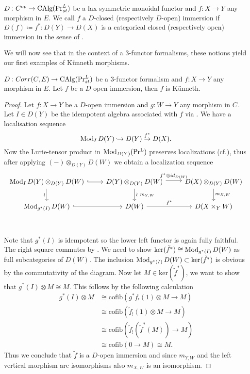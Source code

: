 \begin{definition}\label{def open immersion for D Cop}
$D: C^{op} \to \operatorname{CAlg}(\Pr_{st}^L)$ be a lax symmetric monoidal functor and $f: X \to Y$ any morphism in $E$. We call $f$ a $D$-closed  (respectively $D$-open) immersion if $D(f)\coloneqq f^* : D(Y) \to D(X)$ is a categorical closed (respectively open) immersion in the sense of .
\end{definition}
We will now see that in the context of a $3$-functor formalisms, these notions yield our first examples of Künneth morphisms.
\begin{proposition}\label{open immersion and closed immersions are Künneth}
$D: Corr(C,E) \to \operatorname{CAlg}(\Pr_{st}^L)$ be a $3$-functor formalism and $f: X \to Y$ any morphism in $E$. 
Let $f$ be a $D$-open immersion, then $f$ is Künneth.

\end{proposition}
\begin{proof}
 Let $f: X \to Y$ be a $D$-open immersion and $g: W \to Y$ any morphism in $C$. Let $I \in D(Y)$ be the idempotent algebra associated with $f$ via . We have a localisation sequence
 \[
 \operatorname{Mod}_ID(Y) \hookrightarrow D(Y) \overset{f^*}{\to} D(X).
 \]
 Now the Lurie-tensor product in $\operatorname{Mod}_{D(Y)}(\operatorname{Pr^{L}})$ preserves localizations (cf.\Cite[Corollary 1.46]{ramzi2024dualizable}), thus after applying $(-)\otimes_{D(Y)}D(W)$ we obtain a localization sequence
\[\begin{tikzcd}
	{\Mod_ID(Y)\otimes_{D(Y)}D(W)} & {D(Y)\otimes_{D(Y)}D(W)} & {D(X)\otimes_{D(Y)}D(W)} \\
	{\Mod_{g^*(I)}D(W)} & {D(W)} & {D(X\times_YW)} \\
	{}
	\arrow[hook, from=1-1, to=1-2]
	\arrow["\wr"', from=1-1, to=2-1]
	\arrow["{f^*\otimes id_{D(W)}}", shift left, from=1-2, to=1-3]
	\arrow["{\wr \ m_{Y,W}}", from=1-2, to=2-2]
	\arrow["{m_{X,W}}", from=1-3, to=2-3]
	\arrow[hook, from=2-1, to=2-2]
	\arrow["{\tilde{f}^*}", from=2-2, to=2-3]
\end{tikzcd}\]
Note that $g^*(I)$ is idempotent so the lower left functor is again fully faithful. The right square commutes by . We need to show $\text{ker}(\tilde{f}^*)\cong \operatorname{Mod}_{g^*(I)}D(W)$ as full subcategories of $D(W)$. The inclusion $\operatorname{Mod}_{g^*(I)}D(W)\subset \text{ker}(\tilde{f}^*)$ is obvious by the commutativity of the diagram. Now let $M \in  \text{ker}(\tilde{f}^*)$, we want to show that $g^*(I) \otimes M \cong M$. This follows by the following calculation
\begin{align*}
    g^*(I) \otimes M & \cong \text{cofib}(g^*f_!(1)\otimes M \to M) \\
    & \cong \text{cofib}(\tilde{f}_!(1)\otimes M \to M) \\
    & \cong \text{cofib}(\tilde{f}_!(\tilde{f}^*(M)) \to M) \\
    & \cong  \text{cofib}(0\to M)\cong M.
\end{align*}
Thus we conclude that $\tilde{f}$ is a $D$-open immersion and since $m_{Y,W}$ and the left vertical morphism are isomorphisms also $m_{X,W}$ is an isomorphism.
\end{proof}

